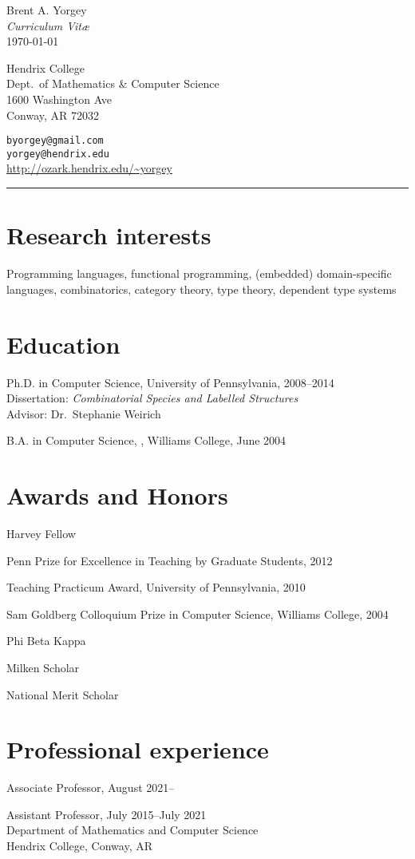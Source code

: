 \documentclass[12pt]{article}
\newcommand{\cvitem}{\par\hangpara{2em}{1}}
\begin{document}
\begin{center}
  {\huge Brent A. Yorgey} \\
  \emph{Curriculum Vit\ae} \\
  \today
\end{center}

\noindent
\parbox{3.5in}{
Hendrix College \\
Dept.\ of Mathematics \& Computer Science \\
1600 Washington Ave \\
Conway, AR 72032
}
\hfill
\parbox{3in}{
\texttt{byorgey@gmail.com} \\
\texttt{yorgey@hendrix.edu} \\
\url{http://ozark.hendrix.edu/~yorgey}
}
\medskip

\hrule


\section*{Research interests}
Programming languages, functional programming, (embedded)
domain-specific languages, combinatorics, category theory, type
theory, dependent type systems

\section*{Education}
\cvitem
Ph.D. in Computer Science, University of
Pennsylvania, 2008--2014 \\ Dissertation: \emph{Combinatorial
  Species and Labelled Structures} \\ Advisor: Dr.\ Stephanie Weirich

\cvitem B.A. in Computer Science, , Williams
College, June 2004

\section*{Awards and Honors}
\cvitem Harvey Fellow
\cvitem Penn Prize for Excellence in Teaching by Graduate Students, 2012
\cvitem Teaching Practicum Award, University of Pennsylvania, 2010
\cvitem Sam Goldberg Colloquium Prize in Computer Science, Williams
College, 2004
\cvitem Phi Beta Kappa
\cvitem Milken Scholar
\cvitem National Merit Scholar

\section*{Professional experience}
\cvitem
Associate Professor, August 2021--
\cvitem
Assistant Professor, July 2015--July 2021\\
Department of Mathematics and Computer Science \\
Hendrix College, Conway, AR
\end{document}
